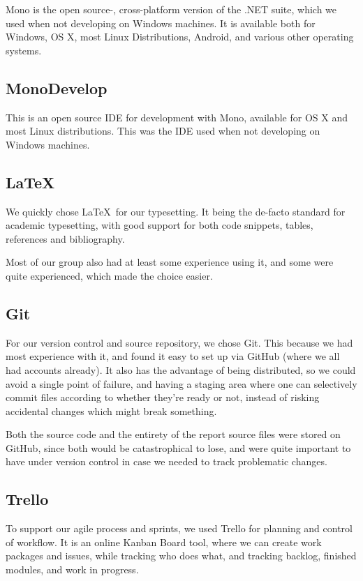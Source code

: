 \documentclass[12pt, a4paper]{article}
\begin{document}
Mono is the open source-, cross-platform version of the .NET suite, which we used when not developing on Windows machines. It is available both for Windows, OS X, most Linux Distributions, Android, and various other operating systems.

\subsection{MonoDevelop}
This is an open source IDE for development with Mono, available for OS X and most Linux distributions. This was the IDE used when not developing on Windows machines.

\subsection{\LaTeX}
We quickly chose \LaTeX \ for our typesetting. It being the de-facto standard for academic typesetting, with good support for both code snippets, tables, references and bibliography.

Most of our group also had at least some experience using it, and some were quite experienced, which made the choice easier.

\subsection{Git}
For our version control and source repository, we chose Git. This because we had most experience with it, and found it easy to set up via GitHub (where we all had accounts already). It also has the advantage of being distributed, so we could avoid a single point of failure, and having a staging area where one can selectively commit files according to whether they're ready or not, instead of risking accidental changes which might break something.

Both the source code and the entirety of the report source files were stored on GitHub, since both would be catastrophical to lose, and were quite important to have under version control in case we needed to track problematic changes.

\subsection{Trello}
To support our agile process and sprints, we used Trello for planning and control of workflow. It is an online Kanban Board tool, where we can create work packages and issues, while tracking who does what, and tracking backlog, finished modules, and work in progress.
\end{document}
